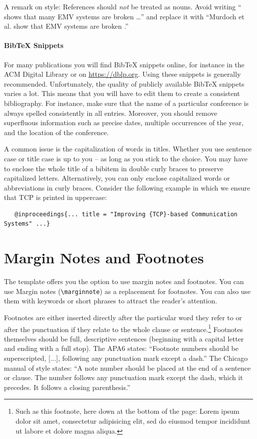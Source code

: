 A remark on style: References should \emph{not} be treated as nouns. Avoid writing ``\cite{murdoch_steven_j._chip_2010} shows that many EMV systems are broken \ldots'' and replace it with ``Murdoch et al. show that EMV systems are broken  \cite{murdoch_steven_j._chip_2010}.''

\paragraph{BibTeX Snippets}

For many publications you will find BibTeX snippets online, for instance in the ACM Digital Library or on \url{https://dblp.org}. Using these snippets is generally recommended. Unfortunately, the quality of publicly available BibTeX snippets varies a lot. This means that you will have to edit them to create a consistent bibliography. For instance, make sure that the name of a particular conference is always spelled consistently in all entries. Moreover, you should remove superfluous information such as precise dates, multiple occurrences of the year, and the location of the conference.

A common issue is the capitalization of words in titles. Whether you use sentence case or title case is up to you -- as long as you stick to the choice. You may have to enclose the whole title of a bibitem in double curly braces to preserve capitalized letters. Alternatively, you can only enclose capitalized words or abbreviations in curly braces. Consider the following example in which we ensure that TCP is printed in uppercase:
\begin{verbatim}
   @inproceedings{... title = "Improving {TCP}-based Communication Systems" ...}
\end{verbatim}

\section{Margin Notes and Footnotes}

The template offers you the option to use margin notes and footnotes. You can use Margin notes (\verb|\marginnote|) as a replacement for footnotes. You can also use them with keywords or short phrases to attract the reader's attention.

Footnotes are either inserted directly after the particular word they refer to or after the punctuation if they relate to the whole clause or sentence.\footnote{Such as this footnote, here down at the bottom of the page: Lorem ipsum dolor sit amet, consectetur adipisicing elit, sed do eiusmod tempor incididunt ut labore et dolore magna aliqua.} Footnotes themselves should be full, descriptive sentences (beginning with a capital letter and ending with a full stop). The APA6 states: \enquote{Footnote numbers should be superscripted, [...], following any punctuation mark except a dash.} The Chicago manual of style states: \enquote{A note number should be placed at the end of a sentence or clause. The number follows any punctuation mark except the dash, which it precedes. It follows a closing parenthesis.}

